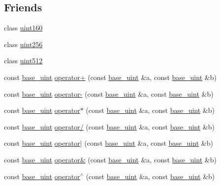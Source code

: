 \subsection*{Friends}
\begin{DoxyCompactItemize}
\item 
class \hyperlink{classbase__uint_aa02da58f540b087723acd9a92ceca5f1}{uint160}
\item 
class \hyperlink{classbase__uint_a2748616a40a1e4fdd6db14b92e9619e2}{uint256}
\item 
class \hyperlink{classbase__uint_a0d7ebbc9f372d8d9d46f50083d0aaad7}{uint512}
\item 
const \hyperlink{classbase__uint}{base\+\_\+uint} \hyperlink{classbase__uint_ab46abc7a4c02bbbe6ee4d44db58f36fd}{operator+} (const \hyperlink{classbase__uint}{base\+\_\+uint} \&a, const \hyperlink{classbase__uint}{base\+\_\+uint} \&b)
\item 
const \hyperlink{classbase__uint}{base\+\_\+uint} \hyperlink{classbase__uint_a42603f675219a79c1087da39677dd6d3}{operator-\/} (const \hyperlink{classbase__uint}{base\+\_\+uint} \&a, const \hyperlink{classbase__uint}{base\+\_\+uint} \&b)
\item 
const \hyperlink{classbase__uint}{base\+\_\+uint} \hyperlink{classbase__uint_a7cc93af608b4d2b8e45f8a18bb085cf0}{operator$\ast$} (const \hyperlink{classbase__uint}{base\+\_\+uint} \&a, const \hyperlink{classbase__uint}{base\+\_\+uint} \&b)
\item 
const \hyperlink{classbase__uint}{base\+\_\+uint} \hyperlink{classbase__uint_a3027097ea3718db496e486d5c64a6bbd}{operator/} (const \hyperlink{classbase__uint}{base\+\_\+uint} \&a, const \hyperlink{classbase__uint}{base\+\_\+uint} \&b)
\item 
const \hyperlink{classbase__uint}{base\+\_\+uint} \hyperlink{classbase__uint_af11d7776598f6633c139636314f065d6}{operator$\vert$} (const \hyperlink{classbase__uint}{base\+\_\+uint} \&a, const \hyperlink{classbase__uint}{base\+\_\+uint} \&b)
\item 
const \hyperlink{classbase__uint}{base\+\_\+uint} \hyperlink{classbase__uint_a7dd38f6935c35d4b534b669c3baf21a6}{operator\&} (const \hyperlink{classbase__uint}{base\+\_\+uint} \&a, const \hyperlink{classbase__uint}{base\+\_\+uint} \&b)
\item 
const \hyperlink{classbase__uint}{base\+\_\+uint} \hyperlink{classbase__uint_aa9c66282ad78846e8310984aeb2df49d}{operator$^\wedge$} (const \hyperlink{classbase__uint}{base\+\_\+uint} \&a, const \hyperlink{classbase__uint}{base\+\_\+uint} \&b)

\end{DoxyCompactItemize}
